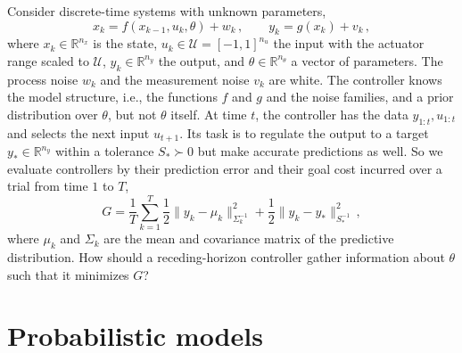 \documentclass{l4dc2027}
\def\cU{\mathcal{U}}
\begin{document}
Consider discrete-time systems with unknown parameters,
\begin{equation}\label{eq:system}
	x_k = f(x_{k-1}, u_k, \theta) + w_k \, , \qquad y_k = g(x_k) + v_k \, ,
\end{equation}
where $x_k \in \mathbb{R}^{n_x}$ is the state, $u_k \in \cU = [-1, 1]^{n_u}$ the input with the actuator range scaled to $\cU$, $y_k \in \mathbb{R}^{n_y}$ the output, and $\theta \in \mathbb{R}^{n_\theta}$ a vector of parameters. The process noise $w_k$ and the measurement noise $v_k$ are white.
The controller knows the model structure, i.e., the functions $f$ and $g$ and the noise families, and a prior distribution over $\theta$, but not $\theta$ itself.
%
At time $t$, the controller has the data $y_{1:t}, u_{1:t}$ and selects the next input $u_{t+1}$. Its task is to regulate the output to a target $y_* \in \mathbb{R}^{n_y}$ within a tolerance $S_* \succ 0$ but make accurate predictions as well. So we evaluate controllers by their prediction error and their goal cost incurred over a trial from time $1$ to $T$,
\begin{equation}\label{eq:metric}
G = \frac{1}{T} \sum_{k=1}^{T}  \frac{1}{2} \|y_k - \mu_k \|^2_{\Sigma_k^{-1}} + \frac{1}{2}\|y_k - y_*\|^2_{S_*^{-1}} \, ,
\end{equation} 
where $\mu_k$ and $\Sigma_k$ are the mean and covariance matrix of the predictive distribution.
How should a receding-horizon controller gather information about $\theta$ such that it minimizes $G$?

\section{Probabilistic models}\label{sec:model}
\end{document}
